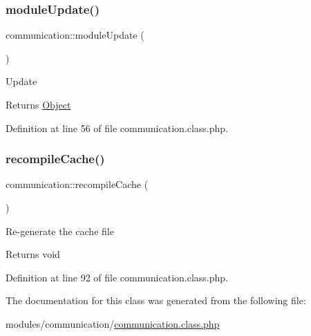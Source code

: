 \subsubsection{\texorpdfstring{module\+Update()}{moduleUpdate()}}
{\footnotesize\ttfamily communication\+::module\+Update (\begin{DoxyParamCaption}{ }\end{DoxyParamCaption})}

Update \begin{DoxyReturn}{Returns}
\hyperlink{classObject}{Object} 
\end{DoxyReturn}


Definition at line 56 of file communication.\+class.\+php.

\mbox{\label{classcommunication_a79303a25f2f20a3bdd40f6af4b8f9a52}} 
\subsubsection{\texorpdfstring{recompile\+Cache()}{recompileCache()}}
{\footnotesize\ttfamily communication\+::recompile\+Cache (\begin{DoxyParamCaption}{ }\end{DoxyParamCaption})}

Re-\/generate the cache file \begin{DoxyReturn}{Returns}
void 
\end{DoxyReturn}


Definition at line 92 of file communication.\+class.\+php.



The documentation for this class was generated from the following file\+:\begin{DoxyCompactItemize}
\item 
modules/communication/\hyperlink{communication_8class_8php}{communication.\+class.\+php}\end{DoxyCompactItemize}
